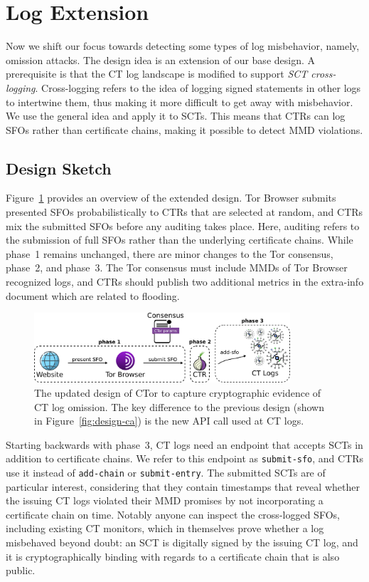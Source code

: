 \section{Log Extension} \label{sec:log}
Now we shift our focus towards detecting some types of log misbehavior, namely,
omission attacks.  The design idea is an
extension of our base design.  A prerequisite is that the CT log landscape
is modified to support \emph{SCT cross-logging}.  Cross-logging refers to the
idea of logging signed statements in other logs to intertwine
them, thus making it more difficult to get away with
misbehavior.  We use the general idea and apply it to SCTs.  This means that
CTRs can log SFOs rather than certificate chains, making it possible to detect
MMD violations.

\subsection{Design Sketch}
Figure~\ref{fig:ext-log} provides an overview of the extended design.  Tor
Browser submits presented SFOs probabilistically to CTRs that are selected
at random, and CTRs mix the submitted SFOs before any auditing takes place.
Here, auditing refers to the submission of full SFOs rather than the underlying
certificate chains.  While phase~1 remains unchanged, there are minor changes
to the Tor consensus, phase~2, and phase~3.  The Tor consensus must include MMDs
of Tor Browser recognized logs, and CTRs should publish two additional metrics
in the extra-info document which are related to flooding.

\begin{figure}
    \centering
    \includegraphics[width=0.85\textwidth]{img/design-log}
	\caption{The updated design of CTor to capture cryptographic evidence of CT
	log omission. The key difference to the previous design (shown in
	Figure~\ref{fig:design-ca}) is the new API call used at CT logs.}
    \label{fig:ext-log}
\end{figure}

Starting backwards with phase~3, CT logs need an endpoint that accepts SCTs in
addition to certificate chains.  We refer to this endpoint as
\texttt{submit-sfo}, and CTRs use it instead of \texttt{add-chain} or
\texttt{submit-entry}.  The submitted SCTs are of particular interest,
considering that they contain timestamps that reveal whether the issuing CT logs
violated their MMD promises by not incorporating a certificate chain on time.
Notably anyone can inspect the cross-logged SFOs, including existing CT
monitors, which in themselves prove whether a log misbehaved beyond doubt:
	an SCT is digitally signed by the issuing CT log, and
	it is cryptographically binding with regards to a certificate chain that
		is also public.

